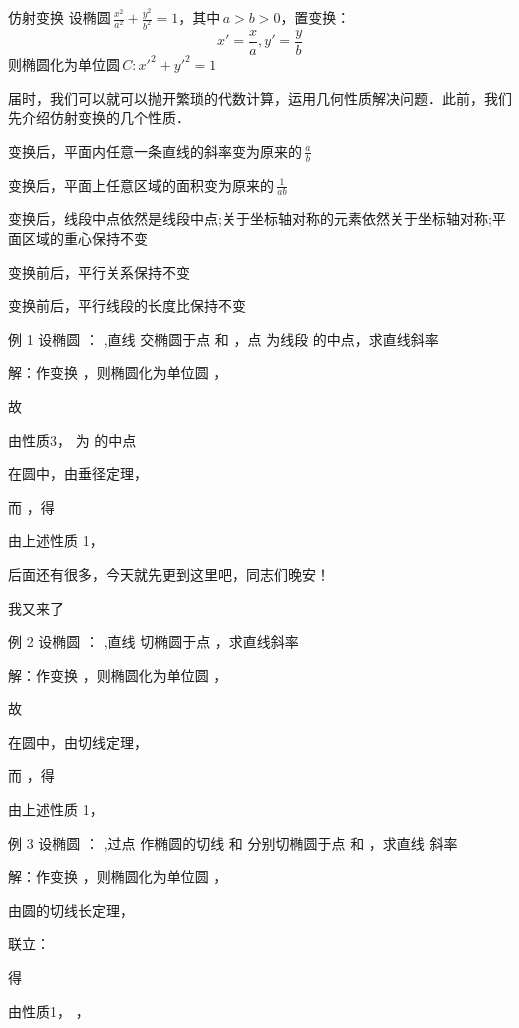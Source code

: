 \begin{definition}{仿射变换}
设椭圆\,\(\frac{x^2}{a^2}+\frac{y^2}{b^2}=1\)，其中\,\(a>b>0\)，置变换：
$$x'=\frac{x}{a},y'=\frac{y}{b}$$
则椭圆化为单位圆\,\(C:x'^2+y'^2=1\)
\end{definition}
届时，我们可以就可以抛开繁琐的代数计算，运用几何性质解决问题．此前，我们先介绍仿射变换的几个性质．
\begin{lemma}{}
变换后，平面内任意一条直线的斜率变为原来的\,\(\frac{a}{b}\)
\end{lemma}
\begin{lemma}{}
变换后，平面上任意区域的面积变为原来的\,\(\frac1{ab}\)
\end{lemma}
\begin{lemma}{}
变换后，线段中点依然是线段中点;关于坐标轴对称的元素依然关于坐标轴对称;平面区域的重心保持不变
\end{lemma}
\begin{lemma}{}
变换前后，平行关系保持不变
\end{lemma}
\begin{lemma}{}
变换前后，平行线段的长度比保持不变
\end{lemma}
例 1 设椭圆 
：
 ,直线  交椭圆于点  和 ，点  为线段  的中点，求直线斜率


解：作变换  ，则椭圆化为单位圆 ，

故 

由性质3，  为  的中点

在圆中，由垂径定理， 

而  ，得 

由上述性质 1， 

后面还有很多，今天就先更到这里吧，同志们晚安！

我又来了~

例 2 设椭圆 
：
 ,直线  切椭圆于点 ，求直线斜率

解：作变换  ，则椭圆化为单位圆 ，

故 

在圆中，由切线定理， 

而  ，得 

由上述性质 1， 

例 3 设椭圆 
：
 ,过点   作椭圆的切线  和  分别切椭圆于点  和  ，求直线  斜率


解：作变换  ，则椭圆化为单位圆 ，

由圆的切线长定理， 

联立： 

得 

由性质1，  ， 

